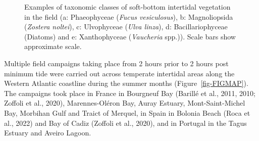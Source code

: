 \documentclass[
  letterpaper,
  11pt,
  english,
  singlespacing,
  headsepline]{MastersDoctoralThesis}
\begin{document}
\begin{spacing}{1.5}
\begin{table}
{}

\end{table}%

\begin{figure}


\caption{\label{fig-Images}Examples of taxonomic classes of soft-bottom
intertidal vegetation in the field (a: Phaeophyceae (\emph{Fucus
vesiculosus}), b: Magnoliopsida (\emph{Zostera noltei}), c: Ulvophyceae
(\emph{Ulva linza}), d: Bacillariophyceae (Diatoms) and e: Xanthophyceae
(\emph{Vaucheria} spp.)). Scale bars show approximate scale.}

\end{figure}%

Multiple field campaigns taking place from 2 hours prior to 2 hours post
minimum tide were carried out across temperate intertidal areas along
the Western Atlantic coastline during the summer months
(Figure~\ref{fig-FIGMAP}). The campaigns took place in France in
Bourgneuf Bay (Barillé et al., 2011, 2010; Zoffoli et al., 2020),
Marennes-Oléron Bay, Auray Estuary, Mont-Saint-Michel Bay, Morbihan Gulf
and Traict of Merquel, in Spain in Bolonia Beach (Roca et al., 2022) and
Bay of Cadiz (Zoffoli et al., 2020), and in Portugal in the Tagus
Estuary and Aveiro Lagoon.

\begin{figure}

\centering{

}
\end{figure}
\end{spacing}
\end{document}
